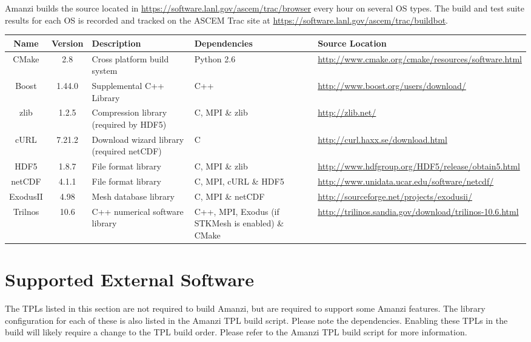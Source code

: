 \documentclass[12pt]{article}
\begin{document}
Amanzi builds the source located in \url{https://software.lanl.gov/ascem/trac/browser} every hour on several OS types.
The build and test suite results for each OS is recorded and tracked on the ASCEM Trac
site at \url{https://software.lanl.gov/ascem/trac/buildbot}. 

\begin{table}[htdp]
\begin{center}
\begin{tabular}{|c|c|p{3cm}|p{3cm}|p{3cm}|}
\hline
\hline
Name & Version & Description & Dependencies & Source Location \\
\hline
CMake & 2.8 & Cross platform build system & Python 2.6 & \url{http://www.cmake.org/cmake/resources/software.html}\\
\hline
Boost & 1.44.0 & Supplemental C++ Library & C++ &  \url{http://www.boost.org/users/download/}\\
\hline
zlib & 1.2.5 &Compression library (required by HDF5) & C, MPI \& zlib &  \url{http://zlib.net/} \\
\hline
cURL & 7.21.2 & Download wizard library (required netCDF) & C & \url{http://curl.haxx.se/download.html} \\
\hline
HDF5 &1.8.7 & File format library & C, MPI \& zlib & \url{http://www.hdfgroup.org/HDF5/release/obtain5.html} \\
\hline
netCDF & 4.1.1 & File format library & C, MPI, cURL \& HDF5 & \url{http://www.unidata.ucar.edu/software/netcdf/} \\
\hline
ExodusII & 4.98 & Mesh database library & C, MPI \& netCDF & \url{http://sourceforge.net/projects/exodusii/}\\
\hline
Trilnos & 10.6 & C++ numerical software library & C++, MPI, Exodus (if STKMesh is enabled) \& CMake & \url{http://trilinos.sandia.gov/download/trilinos-10.6.html} \\
\hline
\hline
\end{tabular}
\end{center}
\label{tab:req_tpl}
\end{table}%


\section*{Supported External Software}
The TPLs listed in this section are not required to build Amanzi, but are required to support some Amanzi features. The 
library configuration for each of these is also listed in the Amanzi TPL build script. Please note the dependencies. Enabling
these TPLs in the build will likely require a change to the TPL build order. Please refer to the Amanzi TPL build script for
more information.
\end{document}
